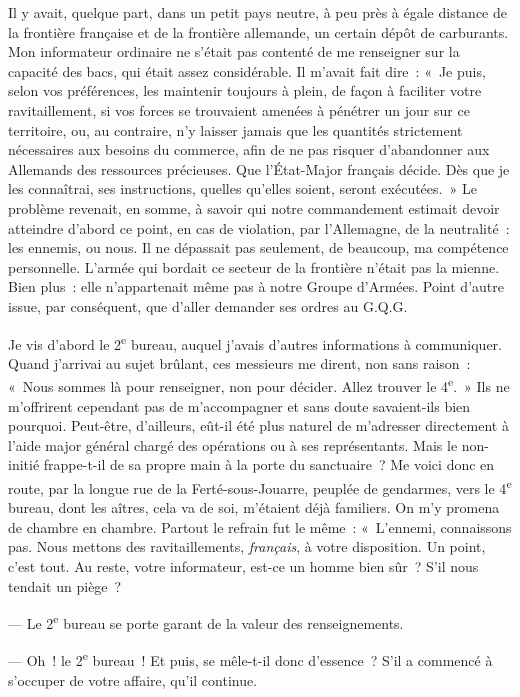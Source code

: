 \documentclass[french,twoside]{book} %
\begin{document}
Il y avait, quelque part, dans un petit pays neutre, à peu près à égale distance de la frontière française et de la frontière allemande, un certain dépôt de   carburants. Mon informateur ordinaire ne s’était pas contenté de me renseigner sur la capacité des bacs, qui était assez considérable. Il m’avait fait dire : « Je puis, selon vos préférences, les maintenir toujours à plein, de façon à faciliter votre ravitaillement, si vos forces se trouvaient amenées à pénétrer un jour sur ce territoire, ou, au contraire, n’y laisser jamais que les quantités strictement nécessaires aux besoins du commerce, afin de ne pas risquer d’abandonner aux Allemands des ressources précieuses. Que l’État-Major français décide. Dès que je les connaîtrai, ses instructions, quelles qu’elles soient, seront exécutées. » Le problème revenait, en somme, à savoir qui notre commandement estimait devoir atteindre d’abord ce point, en cas de violation, par l’Allemagne, de la neutralité : les ennemis, ou nous. Il ne dépassait pas seulement, de beaucoup, ma compétence personnelle. L’armée qui bordait ce secteur de la frontière n’était pas la mienne. Bien plus : elle n’appartenait même pas à notre Groupe d’Armées. Point d’autre issue, par conséquent, que d’aller demander ses ordres au G.Q.G.\par
Je vis d’abord le 2\textsuperscript{e} bureau, auquel j’avais d’autres informations à communiquer. Quand j’arrivai au sujet brûlant, ces messieurs me dirent, non sans raison : « Nous sommes là pour renseigner, non pour décider. Allez trouver le 4\textsuperscript{e}. » Ils ne m’offrirent cependant pas de m’accompagner et sans doute savaient-ils bien pourquoi. Peut-être, d’ailleurs, eût-il été plus naturel de m’adresser directement à l’aide major général chargé des opérations ou à ses représentants. Mais le non-initié frappe-t-il de sa propre main à la porte du sanctuaire ? Me voici donc en route, par la longue rue de la Ferté-sous-Jouarre, peuplée de gendarmes, vers le 4\textsuperscript{e} bureau, dont les aîtres, cela va de soi, m’étaient déjà familiers. On m’y promena de chambre en chambre. Partout le refrain fut le même : « L’ennemi, connaissons pas. Nous mettons des ravitaillements, {\itshape français}, à votre   disposition. Un point, c’est tout. Au reste, votre informateur, est-ce un homme bien sûr ? S’il nous tendait un piège ?\par
— Le 2\textsuperscript{e} bureau se porte garant de la valeur des renseignements.\par
— Oh ! le 2\textsuperscript{e} bureau ! Et puis, se mêle-t-il donc d’essence ? S’il a commencé à s’occuper de votre affaire, qu’il continue.\par
\end{document}

